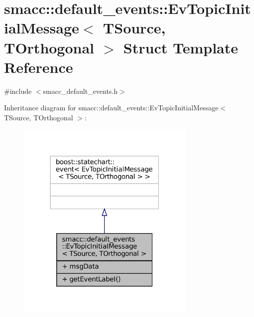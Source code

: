 \hypertarget{structsmacc_1_1default__events_1_1EvTopicInitialMessage}{}\section{smacc\+:\+:default\+\_\+events\+:\+:Ev\+Topic\+Initial\+Message$<$ T\+Source, T\+Orthogonal $>$ Struct Template Reference}
\label{structsmacc_1_1default__events_1_1EvTopicInitialMessage}


{\ttfamily \#include $<$smacc\+\_\+default\+\_\+events.\+h$>$}



Inheritance diagram for smacc\+:\+:default\+\_\+events\+:\+:Ev\+Topic\+Initial\+Message$<$ T\+Source, T\+Orthogonal $>$\+:
\nopagebreak
\begin{figure}[H]
\begin{center}
\leavevmode
\includegraphics[width=243pt]{structsmacc_1_1default__events_1_1EvTopicInitialMessage__inherit__graph}
\end{center}
\end{figure}


